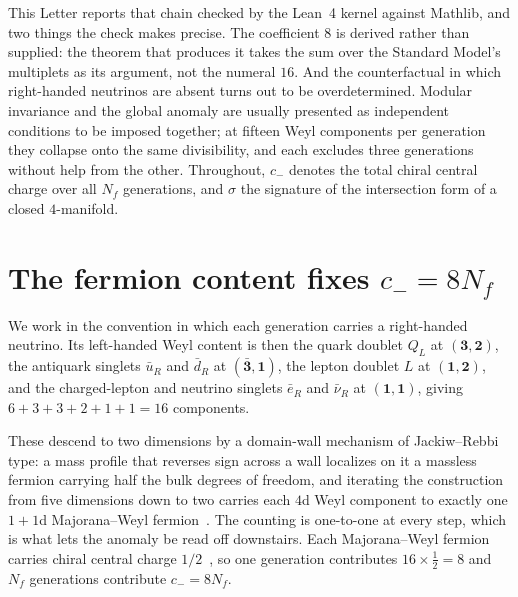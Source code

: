 \documentclass[aps,prl,twocolumn,superscriptaddress,nofootinbib]{revtex4-2}
\begin{document}
This Letter reports that chain checked by the Lean~4 kernel against
Mathlib, and two things the check makes precise. The coefficient $8$ is
derived rather than supplied: the theorem that produces it takes the
sum over the Standard Model's multiplets as its argument, not the
numeral $16$. And the counterfactual in which right-handed neutrinos
are absent turns out to be overdetermined. Modular invariance and the
global anomaly are usually presented as independent conditions to be
imposed together; at fifteen Weyl components per generation they
collapse onto the same divisibility, and each excludes three
generations without help from the other. Throughout, $c_-$ denotes the
total chiral central charge over all $N_f$ generations, and $\sigma$
the signature of the intersection form of a closed $4$-manifold.

\section{The fermion content fixes $c_- = 8 N_f$}
\label{sec:central_charge}

We work in the convention in which each generation carries a
right-handed neutrino. Its left-handed Weyl content is then the quark
doublet $Q_L$ at $(\mathbf{3}, \mathbf{2})$, the antiquark singlets
$\bar{u}_R$ and $\bar{d}_R$ at $(\bar{\mathbf{3}}, \mathbf{1})$, the
lepton doublet $L$ at $(\mathbf{1}, \mathbf{2})$, and the
charged-lepton and neutrino singlets $\bar{e}_R$ and $\bar{\nu}_R$ at
$(\mathbf{1}, \mathbf{1})$, giving $6+3+3+2+1+1 = 16$ components.

These descend to two dimensions by a domain-wall mechanism of
Jackiw--Rebbi type: a mass profile that reverses sign across a wall
localizes on it a massless fermion carrying half the bulk degrees of
freedom, and iterating the construction from five dimensions down to
two carries each $4$d Weyl component to exactly one $1+1$d
Majorana--Weyl fermion~\cite[Sec.~II\,A]{Wang2024}. The counting is
one-to-one at every step, which is what lets the anomaly be read off
downstairs. Each Majorana--Weyl fermion carries chiral central charge
$1/2$~\cite[Eqs.~(6)--(11)]{Wang2024}, so one generation contributes
$16 \times \tfrac{1}{2} = 8$ and $N_f$ generations contribute
$c_- = 8 N_f$.
\end{document}
